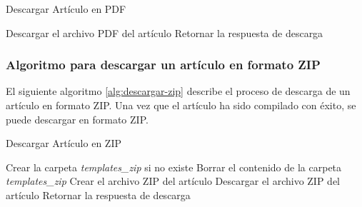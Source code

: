 \begin{algorithm}
    \caption{Descargar Artículo en PDF}
    \begin{algorithmic}[1]
        \State Descargar el archivo PDF del artículo
        \State Retornar la respuesta de descarga
    \EndProcedure
    \end{algorithmic}
    \label{alg:descargar-pdf}
\end{algorithm}

\subsubsection{Algoritmo para descargar un artículo en formato ZIP}
El siguiente algoritmo \ref{alg:descargar-zip} describe el proceso de descarga de un artículo en formato ZIP. Una vez que el artículo ha sido compilado con éxito, se puede descargar en formato ZIP.

\begin{algorithm}
    \caption{Descargar Artículo en ZIP}
    \begin{algorithmic}[1]
        \State Crear la carpeta \textit{templates\_zip} si no existe
        \State Borrar el contenido de la carpeta \textit{templates\_zip}
        \State Crear el archivo ZIP del artículo
        \State Descargar el archivo ZIP del artículo
        \State Retornar la respuesta de descarga
    \EndProcedure
    \end{algorithmic}
    \label{alg:descargar-zip}
\end{algorithm}

